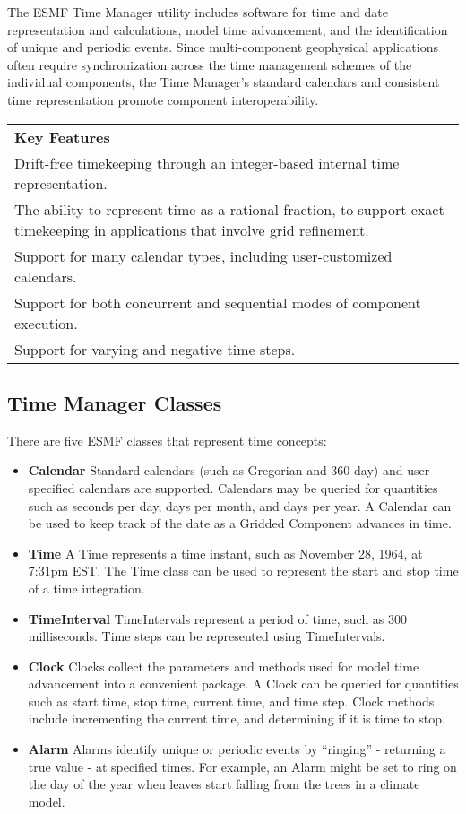 
The ESMF Time Manager utility includes software for time and date 
representation and calculations, model time advancement, and the 
identification of unique and periodic events.  Since multi-component 
geophysical applications often require synchronization across
the time management schemes of the individual components, the 
Time Manager's standard calendars and consistent time representation 
promote component interoperability.
\begin{center}  
\begin{tabular}{|p{6in}|}
\hline
\vspace{.05in}
{\bf Key Features} \\[.05in]
Drift-free timekeeping through an integer-based internal time 
representation. \\
The ability to represent time as a rational fraction, to support 
exact timekeeping in applications that involve grid refinement. \\
Support for many calendar types, including user-customized calendars. \\
Support for both concurrent and sequential modes of component execution. \\
Support for varying and negative time steps. \\[.05in] \hline
\end{tabular}
\end{center}

\subsection{Time Manager Classes}
There are five ESMF classes that represent time concepts:
\begin{itemize}
\item {\bf Calendar}  Standard calendars (such as Gregorian 
and 360-day) and user-specified calendars are supported.  
Calendars may be queried for quantities such as seconds per day, 
days per month, and days per year.  A Calendar can be 
used to keep track of the date as a Gridded Component advances 
in time. 
\item {\bf Time} A Time represents a time instant, such as 
November 28, 1964, at 7:31pm EST.  The Time class can be used 
to represent the start and stop time of a time integration.
\item {\bf TimeInterval} TimeIntervals represent a period 
of time, such as 300 milliseconds.  Time steps can be represented 
using TimeIntervals.  
\item {\bf Clock} Clocks collect the parameters and 
methods used for model time advancement into a convenient 
package.  A Clock can be queried for quantities such
as start time, stop time, current time, and time step.  Clock
methods include incrementing the current time, and determining
if it is time to stop.  
\item {\bf Alarm} Alarms identify unique or periodic events
by ``ringing'' - returning a true value - at specified times.  
For example, an Alarm might be set to ring on the day of the 
year when leaves start falling from the trees in a climate model.
\end{itemize}


